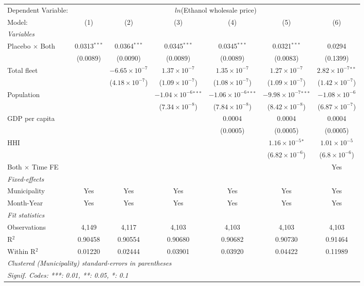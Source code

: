 \documentclass[
]{article}
\begin{document}
\begin{tabular}{lcccccc}
\tabularnewline\midrule\midrule
Dependent Variable:&\multicolumn{6}{c}{$ln$(Ethanol wholesale price)}\\
Model:&(1) & (2) & (3) & (4) & (5) & (6)\\
\midrule \emph{Variables}&   &   &   &   &   &  \\
Placebo $\times $ Both & 0.0313$^{***}$ & 0.0364$^{***}$ & 0.0345$^{***}$ & 0.0345$^{***}$ & 0.0321$^{***}$ & 0.0294\\
  &(0.0089) & (0.0090) & (0.0089) & (0.0089) & (0.0083) & (0.1399)\\
Total fleet &    & $-6.65\times 10^{-7}$ & $1.37\times 10^{-7}$ & $1.35\times 10^{-7}$ & $1.27\times 10^{-7}$ & $2.82\times 10^{-7}$$^{**}$\\
  &   & ($4.18\times 10^{-7}$) & ($1.09\times 10^{-7}$) & ($1.08\times 10^{-7}$) & ($1.09\times 10^{-7}$) & ($1.42\times 10^{-7}$)\\
Population &    &    & $-1.04\times 10^{-6}$$^{***}$ & $-1.06\times 10^{-6}$$^{***}$ & $-9.98\times 10^{-7}$$^{***}$ & $-1.08\times 10^{-6}$\\
  &   &    & ($7.34\times 10^{-8}$) & ($7.84\times 10^{-8}$) & ($8.42\times 10^{-8}$) & ($6.87\times 10^{-7}$)\\
GDP per capita &    &    &    & 0.0004 & 0.0004 & 0.0004\\
  &   &    &    & (0.0005) & (0.0005) & (0.0005)\\
HHI &    &    &    &    & $1.16\times 10^{-5}$$^{*}$ & $1.01\times 10^{-5}$\\
  &   &    &    &    & ($6.82\times 10^{-6}$) & ($6.8\times 10^{-6}$)\\
Both $\times$ Time FE &  &  &  &  &  & Yes\\
\midrule \emph{Fixed-effects}&   &   &   &   &   &  \\
Municipality & Yes & Yes & Yes & Yes & Yes & Yes\\
Month-Year & Yes & Yes & Yes & Yes & Yes & Yes\\
\midrule \emph{Fit statistics}&  & & & & & \\
Observations & 4,149&4,117&4,103&4,103&4,103&4,103\\
R$^2$ & 0.90458&0.90554&0.90680&0.90682&0.90730&0.91464\\
Within R$^2$ & 0.01220&0.02444&0.03901&0.03920&0.04422&0.11989\\
\midrule\midrule\multicolumn{7}{l}{\emph{Clustered (Municipality) standard-errors in parentheses}}\\
\multicolumn{7}{l}{\emph{Signif. Codes: ***: 0.01, **: 0.05, *: 0.1}}\\
\end{tabular}
\end{document}
